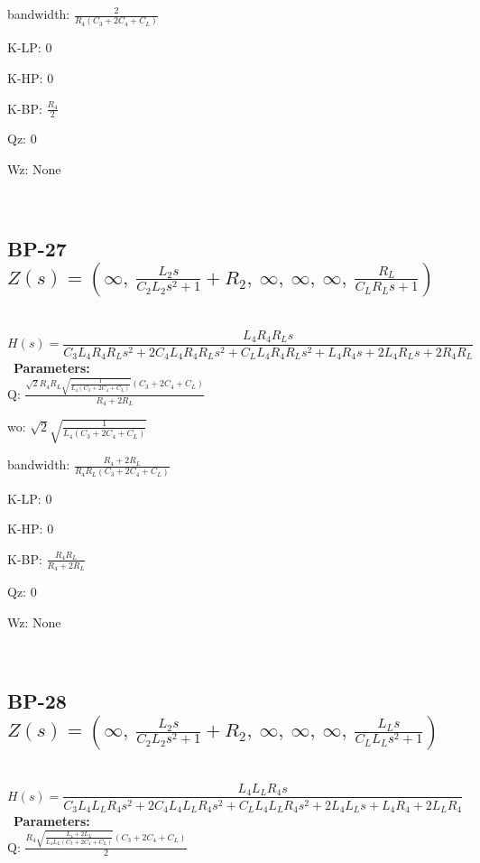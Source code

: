 \documentclass{article}
\begin{document}
bandwidth: $\frac{2}{R_{4} \left(C_{3} + 2 C_{4} + C_{L}\right)}$\ 

K-LP: $0$\ 

K-HP: $0$\ 

K-BP: $\frac{R_{4}}{2}$\ 

Qz: $0$\ 

Wz: $\text{None}$\ 

\ 

\subsection{BP-27 $Z(s) = \left( \infty, \  \frac{L_{2} s}{C_{2} L_{2} s^{2} + 1} + R_{2}, \  \infty, \  \infty, \  \infty, \  \frac{R_{L}}{C_{L} R_{L} s + 1}\right)$ } \ 
\textbf{\[H(s) = \frac{L_{4} R_{4} R_{L} s}{C_{3} L_{4} R_{4} R_{L} s^{2} + 2 C_{4} L_{4} R_{4} R_{L} s^{2} + C_{L} L_{4} R_{4} R_{L} s^{2} + L_{4} R_{4} s + 2 L_{4} R_{L} s + 2 R_{4} R_{L}}\] } \ 
\textbf{Parameters:}\\ 

Q: $\frac{\sqrt{2} R_{4} R_{L} \sqrt{\frac{1}{L_{4} \left(C_{3} + 2 C_{4} + C_{L}\right)}} \left(C_{3} + 2 C_{4} + C_{L}\right)}{R_{4} + 2 R_{L}}$\ 

wo: $\sqrt{2} \sqrt{\frac{1}{L_{4} \left(C_{3} + 2 C_{4} + C_{L}\right)}}$\ 

bandwidth: $\frac{R_{4} + 2 R_{L}}{R_{4} R_{L} \left(C_{3} + 2 C_{4} + C_{L}\right)}$\ 

K-LP: $0$\ 

K-HP: $0$\ 

K-BP: $\frac{R_{4} R_{L}}{R_{4} + 2 R_{L}}$\ 

Qz: $0$\ 

Wz: $\text{None}$\ 

\ 

\subsection{BP-28 $Z(s) = \left( \infty, \  \frac{L_{2} s}{C_{2} L_{2} s^{2} + 1} + R_{2}, \  \infty, \  \infty, \  \infty, \  \frac{L_{L} s}{C_{L} L_{L} s^{2} + 1}\right)$ } \ 
\textbf{\[H(s) = \frac{L_{4} L_{L} R_{4} s}{C_{3} L_{4} L_{L} R_{4} s^{2} + 2 C_{4} L_{4} L_{L} R_{4} s^{2} + C_{L} L_{4} L_{L} R_{4} s^{2} + 2 L_{4} L_{L} s + L_{4} R_{4} + 2 L_{L} R_{4}}\] } \ 
\textbf{Parameters:}\\ 

Q: $\frac{R_{4} \sqrt{\frac{L_{4} + 2 L_{L}}{L_{4} L_{L} \left(C_{3} + 2 C_{4} + C_{L}\right)}} \left(C_{3} + 2 C_{4} + C_{L}\right)}{2}$\ 
\end{document}
